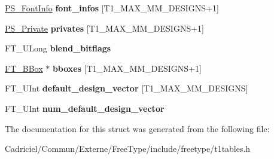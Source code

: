 \begin{DoxyCompactItemize}
\item 
\hypertarget{struct_p_s___blend_rec___ac5478cafc838257e693a9604edf1f5e9}{\hyperlink{struct_p_s___font_info_rec__}{P\-S\-\_\-\-Font\-Info} {\bfseries font\-\_\-infos} \mbox{[}T1\-\_\-\-M\-A\-X\-\_\-\-M\-M\-\_\-\-D\-E\-S\-I\-G\-N\-S+1\mbox{]}}\label{struct_p_s___blend_rec___ac5478cafc838257e693a9604edf1f5e9}

\item 
\hypertarget{struct_p_s___blend_rec___a2b6e0c48d7a9c350b09f2943c1779ea4}{\hyperlink{struct_p_s___private_rec__}{P\-S\-\_\-\-Private} {\bfseries privates} \mbox{[}T1\-\_\-\-M\-A\-X\-\_\-\-M\-M\-\_\-\-D\-E\-S\-I\-G\-N\-S+1\mbox{]}}\label{struct_p_s___blend_rec___a2b6e0c48d7a9c350b09f2943c1779ea4}

\item 
\hypertarget{struct_p_s___blend_rec___a86caa5319e208b4a2057db656bad9221}{F\-T\-\_\-\-U\-Long {\bfseries blend\-\_\-bitflags}}\label{struct_p_s___blend_rec___a86caa5319e208b4a2057db656bad9221}

\item 
\hypertarget{struct_p_s___blend_rec___a30845d3cbd2e95a5f9cc867c7226af5e}{\hyperlink{struct_f_t___b_box__}{F\-T\-\_\-\-B\-Box} $\ast$ {\bfseries bboxes} \mbox{[}T1\-\_\-\-M\-A\-X\-\_\-\-M\-M\-\_\-\-D\-E\-S\-I\-G\-N\-S+1\mbox{]}}\label{struct_p_s___blend_rec___a30845d3cbd2e95a5f9cc867c7226af5e}

\item 
\hypertarget{struct_p_s___blend_rec___a3ddacbda91fe0f9ef934a9e0afa6286f}{F\-T\-\_\-\-U\-Int {\bfseries default\-\_\-design\-\_\-vector} \mbox{[}T1\-\_\-\-M\-A\-X\-\_\-\-M\-M\-\_\-\-D\-E\-S\-I\-G\-N\-S\mbox{]}}\label{struct_p_s___blend_rec___a3ddacbda91fe0f9ef934a9e0afa6286f}

\item 
\hypertarget{struct_p_s___blend_rec___afa5c7dd4206eb8a1d9ef4894abfc9555}{F\-T\-\_\-\-U\-Int {\bfseries num\-\_\-default\-\_\-design\-\_\-vector}}\label{struct_p_s___blend_rec___afa5c7dd4206eb8a1d9ef4894abfc9555}

\end{DoxyCompactItemize}


The documentation for this struct was generated from the following file\-:\begin{DoxyCompactItemize}
\item 
Cadriciel/\-Commun/\-Externe/\-Free\-Type/include/freetype/t1tables.\-h\end{DoxyCompactItemize}
